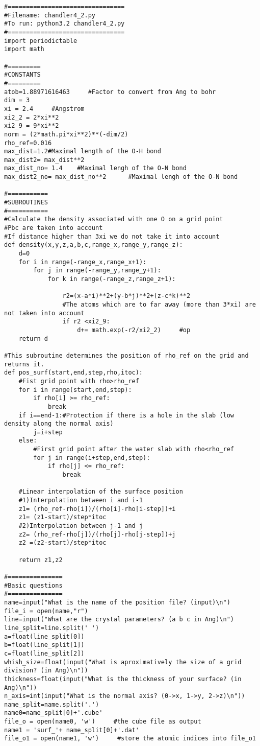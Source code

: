 \begin{lstlisting}
#================================
#Filename: chandler4_2.py 
#To run: python3.2 chandler4_2.py
#================================
import periodictable
import math 

#=========
#CONSTANTS
#=========
atob=1.88971616463     #Factor to convert from Ang to bohr
dim = 3
xi = 2.4     #Angstrom
xi2_2 = 2*xi**2
xi2_9 = 9*xi**2
norm = (2*math.pi*xi**2)**(-dim/2)
rho_ref=0.016
max_dist=1.2#Maximal length of the O-H bond
max_dist2= max_dist**2
max_dist_no= 1.4    #Maximal lengh of the O-N bond
max_dist2_no= max_dist_no**2      #Maximal lengh of the O-N bond

#===========
#SUBROUTINES
#===========
#Calculate the density associated with one O on a grid point
#Pbc are taken into account
#If distance higher than 3xi we do not take it into account
def density(x,y,z,a,b,c,range_x,range_y,range_z): 
	d=0
	for i in range(-range_x,range_x+1): 
		for j in range(-range_y,range_y+1): 
			for k in range(-range_z,range_z+1):

				r2=(x-a*i)**2+(y-b*j)**2+(z-c*k)**2 
				#The atoms which are to far away (more than 3*xi) are not taken into account
				if r2 <xi2_9:
					d+= math.exp(-r2/xi2_2)     #op
	return d 

#This subroutine determines the position of rho_ref on the grid and returns it. 
def pos_surf(start,end,step,rho,itoc):
	#Fist grid point with rho>rho_ref
	for i in range(start,end,step):
		if rho[i] >= rho_ref:
			break
	if i==end-1:#Protection if there is a hole in the slab (low density along the normal axis)
		j=i+step
	else:
		#First grid point after the water slab with rho<rho_ref
		for j in range(i+step,end,step):
			if rho[j] <= rho_ref:
				break

	#Linear interpolation of the surface position 
	#1)Interpolation between i and i-1
	z1= (rho_ref-rho[i])/(rho[i]-rho[i-step])+i
	z1= (z1-start)/step*itoc
	#2)Interpolation between j-1 and j
	z2= (rho_ref-rho[j])/(rho[j]-rho[j-step])+j
	z2 =(z2-start)/step*itoc
	
	return z1,z2

#===============
#Basic questions
#===============
name=input("What is the name of the position file? (input)\n")
file_i = open(name,"r")
line=input("What are the crystal parameters? (a b c in Ang)\n")
line_split=line.split(' ')
a=float(line_split[0])
b=float(line_split[1])
c=float(line_split[2])
whish_size=float(input("What is aproximatively the size of a grid division? (in Ang)\n"))
thickness=float(input("What is the thickness of your surface? (in Ang)\n"))
n_axis=int(input("What is the normal axis? (0->x, 1->y, 2->z)\n"))
name_split=name.split('.')
name0=name_split[0]+'.cube'
file_o = open(name0, 'w')     #the cube file as output
name1 = 'surf_'+ name_split[0]+'.dat' 
file_o1 = open(name1, 'w')     #store the atomic indices into file_o1


\end{lstlisting}
